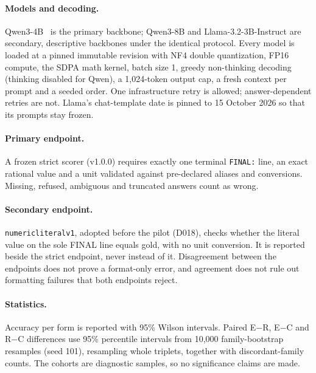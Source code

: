 \documentclass[12pt,a4paper,oneside]{report}
\renewcommand{\_}{\oldunderscore\allowbreak}
\begin{document}
\paragraph{Models and decoding.} Qwen3-4B~\citep{qwen3-2025} is the primary backbone; Qwen3-8B and Llama-3.2-3B-Instruct are secondary, descriptive backbones under the identical protocol. Every model is loaded at a pinned immutable revision with NF4 double quantization, FP16 compute, the SDPA math kernel, batch size 1, greedy non-thinking decoding (thinking disabled for Qwen), a 1,024-token output cap, a fresh context per prompt and a seeded order. One infrastructure retry is allowed; answer-dependent retries are not. Llama's chat-template date is pinned to 15 October 2026 so that its prompts stay frozen.

\paragraph{Primary endpoint.} A frozen strict scorer (v1.0.0) requires exactly one terminal \texttt{FINAL:} line, an exact rational value and a unit validated against pre-declared aliases and conversions. Missing, refused, ambiguous and truncated answers count as wrong.

\paragraph{Secondary endpoint.} \texttt{numeric\_literal\_v1}, adopted before the pilot (D018), checks whether the literal value on the sole FINAL line equals gold, with no unit conversion. It is reported beside the strict endpoint, never instead of it. Disagreement between the endpoints does not prove a format-only error, and agreement does not rule out formatting failures that both endpoints reject.

\paragraph{Statistics.} Accuracy per form is reported with 95\% Wilson intervals. Paired E$-$R, E$-$C and R$-$C differences use 95\% percentile intervals from 10,000 family-bootstrap resamples (seed 101), resampling whole triplets, together with discordant-family counts. The cohorts are diagnostic samples, so no significance claims are made.
\end{document}
